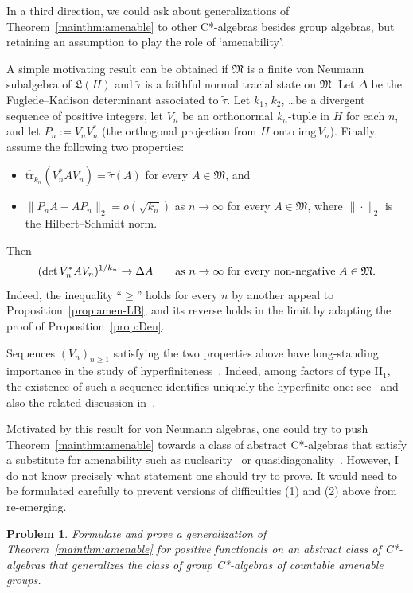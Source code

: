 \documentclass[12pt,a4paper]{article}
\numberwithin{equation}{section}
\newtheorem{prob}[thm]{Problem}
\theoremstyle{remark}
\renewcommand{\rm}[1]{\mathrm{#1}}
\newcommand{\frL}{\mathfrak{L}}
\newcommand{\M}{\mathfrak{M}}
\renewcommand{\t}[1]{\widetilde{#1}}
\newcommand{\tr}{\overline{\mathrm{tr}}}
\begin{document}
In a third direction, we could ask about generalizations of Theorem~\ref{mainthm:amenable} to other C*-algebras besides group algebras, but retaining an assumption to play the role of `amenability'.

A simple motivating result can be obtained if $\M$ is a finite von Neumann subalgebra of $\frL(H)$ and $\t{\tau}$ is a faithful normal tracial state on $\M$.  Let $\Delta$ be the Fuglede--Kadison determinant associated to $\t{\tau}$.  Let $k_1$, $k_2$, \dots be a divergent sequence of positive integers, let $V_n$ be an orthonormal $k_n$-tuple in $H$ for each $n$, and let $P_n := V_nV_n^\ast$ (the orthogonal projection from $H$ onto $\rm{img}\,V_n$).  Finally, assume the following two properties:
\begin{itemize}
\item $\tr_{k_n}(V_n^\ast AV_n) = \t{\tau}(A)$ for every $A \in \M$, and
\item $\|P_nA - AP_n\|_2 = o(\sqrt{k_n})$ as $n\to\infty$ for every $A \in \M$, where $\|\cdot\|_2$ is the Hilbert--Schmidt norm.
\end{itemize}
Then
\[(\det V_n^\ast A V_n)^{1/k_n}\to \Delta A \qquad \hbox{as}\ n\to\infty\ \hbox{for every non-negative}\ A \in \M.\]
Indeed, the inequality ``$\ge$'' holds for every $n$ by another appeal to Proposition~\ref{prop:amen-LB}, and its reverse holds in the limit by adapting the proof of Proposition~\ref{prop:Den}.

Sequences $(V_n)_{n\ge 1}$ satisfying the two properties above have long-standing importance in the study of hyperfiniteness~\cite[Chap. III.7]{Dix--vN}.  Indeed, among factors of type II$_1$, the existence of such a sequence identifies uniquely the hyperfinite one: see~\cite[Thm. 5.1]{Con76} and also the related discussion in~\cite[Sec. 1]{Arv77}.

Motivated by this result for von Neumann algebras, one could try to push Theorem~\ref{mainthm:amenable} towards a class of abstract C*-algebras that satisfy a substitute for amenability such as nuclearity~\cite[Sec. 2.3]{BroOza08} or quasidiagonality~\cite[Chap. 7]{BroOza08}.  However, I do not know precisely what statement one should try to prove.  It would need to be formulated carefully to prevent versions of difficulties (1) and (2) above from re-emerging. %

\begin{prob}
Formulate and prove a generalization of Theorem~\ref{mainthm:amenable} for positive functionals on an abstract class of C*-algebras that generalizes the class of group C*-algebras of countable amenable groups.
\end{prob}
\end{document}
